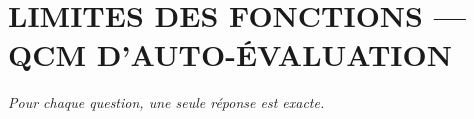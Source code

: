 
\section*{\textcolor{chapcolor}{\MakeUppercase{Limites des fonctions — QCM d'auto-évaluation}}}

\begin{center}
\textit{Pour chaque question, une seule réponse est exacte.}
\end{center}

